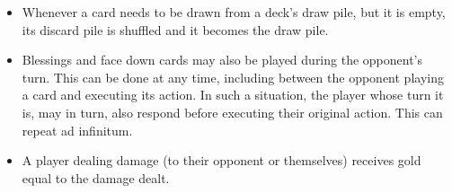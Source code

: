 \documentclass[dvipsnames,parskip,a4paper]{scrartcl}
\begin{document}
\begin{itemize}
\item

Whenever a card needs to be drawn from a deck's draw pile, but it is empty, its discard pile is shuffled and it becomes the draw pile.

\item

Blessings and face down cards may also be played during the opponent's turn. This can be done at any time, including between the opponent playing a card and executing its action. In such a situation, the player whose turn it is, may in turn, also respond before executing their original action. This can repeat ad infinitum.

\item

A player dealing damage (to their opponent or themselves) receives gold equal to the damage dealt.

\end{itemize}

\newpage
\end{document}
